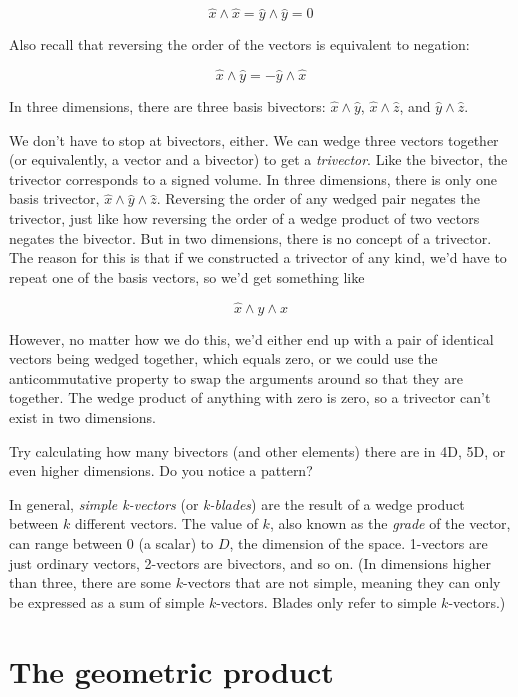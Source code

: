 $$\hat{x} \wedge \hat{x} = \hat{y} \wedge \hat{y} = 0$$

Also recall that reversing the order of the vectors is equivalent to negation:

$$\hat{x} \wedge \hat{y} = -\hat{y} \wedge \hat{x}$$

In three dimensions, there are three basis bivectors: $\hat{x} \wedge \hat{y}$, $\hat{x} \wedge 
\hat{z}$, and $\hat{y} \wedge \hat{z}$. 

We don't have to stop at bivectors, either. We can wedge three vectors together (or equivalently,
a vector and a bivector) to get a \textit{trivector}. Like the bivector, the trivector corresponds
to a signed volume. In three dimensions, there is only one basis trivector, $\hat{x} \wedge 
\hat{y} \wedge \hat{z}$. Reversing the order of any wedged pair negates the trivector, just like
how reversing the order of a wedge product of two vectors negates the bivector. But in two
dimensions, there is no concept of a trivector. The reason for this is that if we constructed
a trivector of any kind, we'd have to repeat one of the basis vectors, so we'd get something like

$$\hat{x} \wedge \hat{y} \wedge \hat{x}$$

However, no matter how we do this, we'd either end up with a pair of identical vectors being wedged
together, which equals zero, or we could use the anticommutative property to swap the arguments 
around so that they are together. The wedge product of anything with zero is zero, so a trivector
can't exist in two dimensions.

\begin{expl}
    Try calculating how many bivectors (and other elements) there are in 4D, 5D, or even higher
    dimensions. Do you notice a pattern?
\end{expl}

In general, \textit{simple k-vectors} (or \textit{k-blades}) are the result of a wedge product
between $k$ different vectors. The value of $k$, also known as the \textit{grade} of the vector,
can range between 0 (a scalar) to $D$, the dimension of the space. 1-vectors are just ordinary 
vectors, 2-vectors are bivectors, and so on. (In dimensions higher than three, there are some
$k$-vectors that are not simple, meaning they can only be expressed as a sum of simple $k$-vectors.
Blades only refer to simple $k$-vectors.)

\section{The geometric product}

